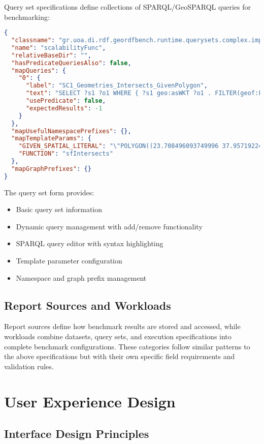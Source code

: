 \documentclass[11pt,a4paper]{article}
\begin{document}
Query set specifications define collections of SPARQL/GeoSPARQL queries for benchmarking:

\begin{lstlisting}[language=JSON, caption=Query Set Specification Example]
{
  "classname": "gr.uoa.di.rdf.geordfbench.runtime.querysets.complex.impl.StaticTempParamQS",
  "name": "scalabilityFunc",
  "relativeBaseDir": "",
  "hasPredicateQueriesAlso": false,
  "mapQueries": {
    "0": {
      "label": "SC1_Geometries_Intersects_GivenPolygon",
      "text": "SELECT ?s1 ?o1 WHERE { ?s1 geo:asWKT ?o1 . FILTER(geof:FUNCTION(?o1, GIVEN_SPATIAL_LITERAL)). }",
      "usePredicate": false,
      "expectedResults": -1
    }
  },
  "mapUsefulNamespacePrefixes": {},
  "mapTemplateParams": {
    "GIVEN_SPATIAL_LITERAL": "\"POLYGON((23.708496093749996 37.95719224376526,...))\"^^<http://www.opengis.net/ont/geosparql#wktLiteral>",
    "FUNCTION": "sfIntersects"
  },
  "mapGraphPrefixes": {}
}
\end{lstlisting}

The query set form provides:
\begin{itemize}
    \item Basic query set information
    \item Dynamic query management with add/remove functionality
    \item SPARQL query editor with syntax highlighting
    \item Template parameter configuration
    \item Namespace and graph prefix management
\end{itemize}

\subsection{Report Sources and Workloads}

Report sources define how benchmark results are stored and accessed, while workloads combine datasets, query sets, and execution specifications into complete benchmark configurations. These categories follow similar patterns to the above specifications but with their own specific field requirements and validation rules.

\section{User Experience Design}

\subsection{Interface Design Principles}
\end{document}
